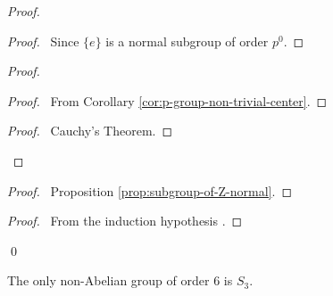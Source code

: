\begin{proof}
\pf
{}
\begin{proof}
	\pf\ Since $\{e\}$ is a normal subgroup of order $p^0$.
\end{proof}
\begin{proof}
	\begin{proof}
		\pf\ From Corollary \ref{cor:p-group-non-trivial-center}.
	\end{proof}
	\begin{proof}
		\pf\ Cauchy's Theorem.
	\end{proof}
\end{proof}
\begin{proof}
	\pf\ Proposition \ref{prop:subgroup-of-Z-normal}.
\end{proof}
\begin{proof}
	\pf\ From the induction hypothesis .
\end{proof}
\qed
\end{proof}

\begin{ex}
The only non-Abelian group of order 6 is $S_3$.
\end{ex}

